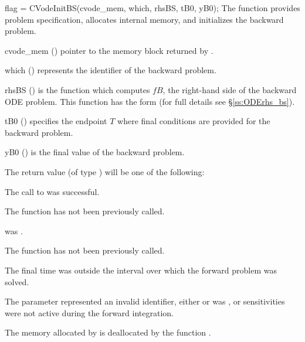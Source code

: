 {
  flag = CVodeInitBS(cvode\_mem, which, rhsBS, tB0, yB0);
}
{
  The function  provides problem specification, allocates internal memory, 
  and initializes the backward problem.
}
{
  \begin{args}
  \item[cvode\_mem] ()
    pointer to the {\cvodes} memory block returned by .
  \item[which] ()
    represents the identifier of the backward problem.
  \item[rhsBS] ()
    is the {\C} function which computes $fB$, the right-hand side of the 
    backward ODE problem. This function has the form 
    (for full details see \S\ref{ss:ODErhs_bs}).
  \item[tB0] ()
    specifies the endpoint $T$ where final conditions are provided for the 
    backward problem.
  \item[yB0] ()
    is the final value of the backward problem. 
  \end{args}
}
{
  The return value  (of type ) will be one of the following:
  \begin{args}
  \item[\Id{CV\_SUCCESS}]
    The call to  was successful.
  \item[\Id{CV\_NO\_MALLOC}]
    The function  has not been previously called.
  \item[\Id{CV\_MEM\_NULL}]
     was .
  \item[\Id{CV\_NO\_ADJ}]
    The function  has not been previously called.
  \item[\Id{CV\_BAD\_TB0}]
    The final time  was outside the interval over which the forward problem
    was solved.
  \item[\Id{CV\_ILL\_INPUT}]
    The parameter  represented an invalid identifier, 
    either  or  was ,
    or sensitivities were not active during the forward integration.
  \end{args}
}
{
  The memory allocated by  is deallocated by the function 
  .  
}

